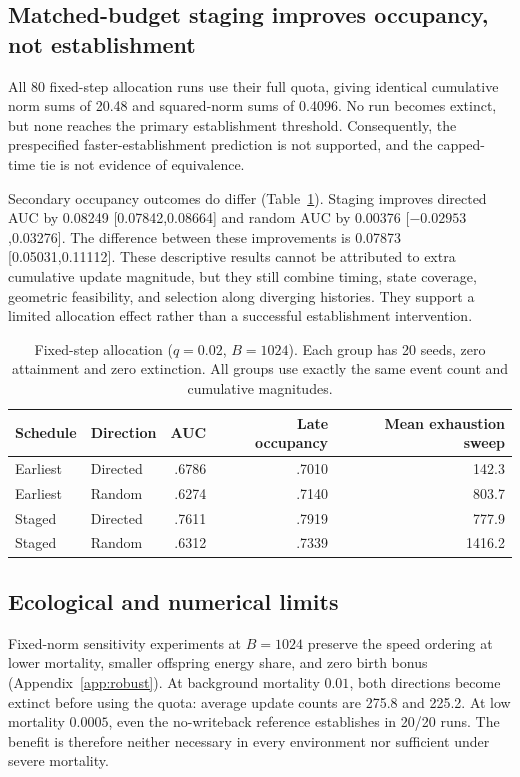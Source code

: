 \documentclass[11pt]{article}
\begin{document}
\subsection{Matched-budget staging improves occupancy, not establishment}
All 80 fixed-step allocation runs use their full quota, giving identical cumulative norm sums of 20.48 and squared-norm sums of 0.4096. No run becomes extinct, but none reaches the primary establishment threshold. Consequently, the prespecified faster-establishment prediction is not supported, and the capped-time tie is not evidence of equivalence.

Secondary occupancy outcomes do differ (Table~\ref{tab:staging}). Staging improves directed AUC by 0.08249 [0.07842,0.08664] and random AUC by 0.00376 [$-0.02953$,0.03276]. The difference between these improvements is 0.07873 [0.05031,0.11112]. These descriptive results cannot be attributed to extra cumulative update magnitude, but they still combine timing, state coverage, geometric feasibility, and selection along diverging histories. They support a limited allocation effect rather than a successful establishment intervention.

\begin{table}[htbp]\centering\small
\caption{Fixed-step allocation ($q=0.02$, $B=1024$). Each group has 20 seeds, zero attainment and zero extinction. All groups use exactly the same event count and cumulative magnitudes.}\label{tab:staging}
\begin{tabular}{llrrr}\toprule
Schedule & Direction & AUC & Late occupancy & Mean exhaustion sweep\\\midrule
Earliest & Directed & .6786 & .7010 & 142.3\\
Earliest & Random & .6274 & .7140 & 803.7\\
Staged & Directed & .7611 & .7919 & 777.9\\
Staged & Random & .6312 & .7339 & 1416.2\\\bottomrule
\end{tabular}
\end{table}

\subsection{Ecological and numerical limits}
Fixed-norm sensitivity experiments at $B=1024$ preserve the speed ordering at lower mortality, smaller offspring energy share, and zero birth bonus (Appendix~\ref{app:robust}). At background mortality $0.01$, both directions become extinct before using the quota: average update counts are 275.8 and 225.2. At low mortality $0.0005$, even the no-writeback reference establishes in 20/20 runs. The benefit is therefore neither necessary in every environment nor sufficient under severe mortality.
\end{document}

